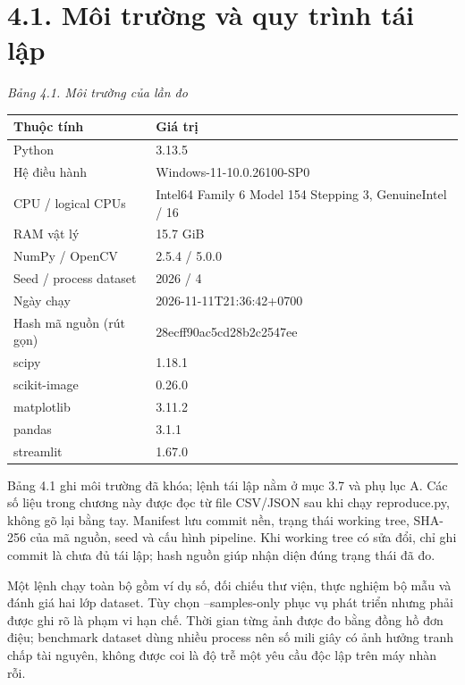 \documentclass[13pt,a4paper]{extreport}
\begin{document}
\section*{4.1. Môi trường và quy trình tái lập}
\noindent\textit{Bảng 4.1. Môi trường của lần đo}
\begin{longtable}{p{7.3cm}|p{7.3cm}}
Thuộc tính & Giá trị\\\hline
Python & 3.13.5\\\hline
Hệ điều hành & Windows-11-10.0.26100-SP0\\\hline
CPU / logical CPUs & Intel64 Family 6 Model 154 Stepping 3, GenuineIntel / 16\\\hline
RAM vật lý & 15.7 GiB\\\hline
NumPy / OpenCV & 2.5.4 / 5.0.0\\\hline
Seed / process dataset & 2026 / 4\\\hline
Ngày chạy & 2026-11-11T21:36:42+0700\\\hline
Hash mã nguồn (rút gọn) & 28ecff90ac5cd28b2c2547ee\\\hline
scipy & 1.18.1\\\hline
scikit-image & 0.26.0\\\hline
matplotlib & 3.11.2\\\hline
pandas & 3.1.1\\\hline
streamlit & 1.67.0\\\hline
\end{longtable}
Bảng 4.1 ghi môi trường đã khóa; lệnh tái lập nằm ở mục 3.7 và phụ lục A. Các số liệu trong chương này được đọc từ file CSV/JSON sau khi chạy reproduce.py, không gõ lại bằng tay. Manifest lưu commit nền, trạng thái working tree, SHA-256 của mã nguồn, seed và cấu hình pipeline. Khi working tree có sửa đổi, chỉ ghi commit là chưa đủ tái lập; hash nguồn giúp nhận diện đúng trạng thái đã đo.
\par
Một lệnh chạy toàn bộ gồm ví dụ số, đối chiếu thư viện, thực nghiệm bộ mẫu và đánh giá hai lớp dataset. Tùy chọn --samples-only phục vụ phát triển nhưng phải được ghi rõ là phạm vi hạn chế. Thời gian từng ảnh được đo bằng đồng hồ đơn điệu; benchmark dataset dùng nhiều process nên số mili giây có ảnh hưởng tranh chấp tài nguyên, không được coi là độ trễ một yêu cầu độc lập trên máy nhàn rỗi.
\par
\clearpage
\end{document}
